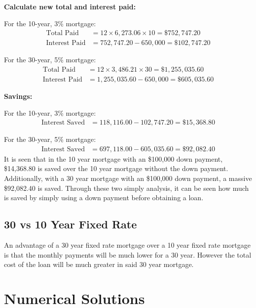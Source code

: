 \documentclass{article}
\numberwithin{figure}{section}
\begin{document}
        \textbf{Calculate new total and interest paid:}
        
        For the 10-year, 3\% mortgage:
        \begin{align*}
            \text{Total Paid} &= 12 \times 6{,}273.06 \times 10 = \$752{,}747.20 \\
            \text{Interest Paid} &= 752{,}747.20 - 650{,}000 = \$102{,}747.20
        \end{align*}
        
        For the 30-year, 5\% mortgage:
        \begin{align*}
            \text{Total Paid} &= 12 \times 3{,}486.21 \times 30 = \$1{,}255{,}035.60 \\
            \text{Interest Paid} &= 1{,}255{,}035.60 - 650{,}000 = \$605{,}035.60
        \end{align*}
        
        \textbf{Savings:}
        
        For the 10-year, 3\% mortgage:
        \begin{align*}
            \text{Interest Saved} &= 118{,}116.00 - 102{,}747.20 = \$15{,}368.80
        \end{align*}
        
        For the 30-year, 5\% mortgage:
        \begin{align*}
            \text{Interest Saved} &= 697{,}118.00 - 605{,}035.60 = \$92{,}082.40
        \end{align*}
        It is seen that in the 10 year mortgage with an \$100,000 down payment, \$14,368.80 is saved over the 10 year mortgage without the down payment. Additionally, with a 30 year mortgage with an \$100,000 down payment, a massive \$92,082.40 is saved. Through these two simply analysis, it can be seen how much is saved by simply using a down payment before obtaining a loan.

    \subsection{30 vs 10 Year Fixed Rate}
        An advantage of a 30 year fixed rate mortgage over a 10 year fixed rate mortgage is that the monthly payments will be much lower for a 30 year. However the total cost of the loan will be much greater in said 30 year mortgage. 
\section{Numerical Solutions}
\end{document}
